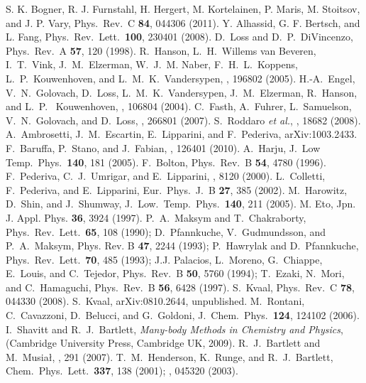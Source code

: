 \documentclass[twocolumn]{revtex4}
\begin{document}
\begin{thebibliography}{200}

 S. K. Bogner, R. J. Furnstahl, H. Hergert, M. Kortelainen, P. Maris, M. Stoitsov, and J. P. Vary, Phys.~Rev.~C {\bf 84}, 044306 (2011).
 Y. Alhassid, G. F. Bertsch, and L. Fang, Phys.~Rev.~Lett.~{\bf 100}, 230401 (2008).
 D.~Loss and D.~P.~DiVincenzo, Phys.~Rev.~A {\bf 57}, 120 (1998).
 R.~Hanson, L.~H.~Willems van Beveren, I.~T.~Vink, J.~M.~Elzerman, W.~J.~M. Naber, F.~H.~L.~Koppens, L.~P.~Kouwenhoven, and L.~M.~K.~Vandersypen, , 196802 (2005).
 H.-A.~Engel, V.~N.~Golovach, D.~Loss, L.~M.~K.~Vandersypen, J.~M.~Elzerman, R.~Hanson, and L.~P.~ Kouwenhoven, , 106804 (2004). 
 C.~Fasth, A.~Fuhrer, L.~Samuelson, V.~N.~Golovach, and D.~Loss, , 266801 (2007).
 S.~Roddaro {\em et al.}, , 18682 (2008).
A.~Ambrosetti, J.~M.~Escartin, E.~Lipparini, and F.~Pederiva, arXiv:1003.2433.
 F.~Baruffa, P.~Stano, and J.~Fabian, , 126401 (2010).
 A.~Harju, J.~Low Temp.~Phys.~{\bf 140}, 181 (2005).
 F.~Bolton, Phys.~Rev.~B {\bf 54}, 4780 (1996).
F.~Pederiva, C.~J.~Umrigar, and E.~Lipparini, , 8120 (2000).
L.~Colletti, F.~Pederiva, and  E.~Lipparini,  Eur.~Phys.~J.~B {\bf 27}, 
385 (2002).
 M.~Harowitz, D.~Shin, and J.~Shumway, J.~Low.~Temp.~Phys.~{\bf 140}, 211 (2005).
 M. Eto, Jpn. J. Appl. Phys. {\bf 36}, 3924 (1997).
 P.~A.~Maksym and T.~Chakraborty, Phys.~Rev.~Lett.~{\bf 65}, 108 (1990);
D.~Pfannkuche, V.~Gudmundsson, and P.~A.~Maksym, Phys. Rev. B {\bf 47}, 2244 (1993);
P.~Hawrylak and D.~Pfannkuche, Phys.~Rev.~Lett.~{\bf 70}, 485 (1993); J.J. Palacios,
L.~Moreno, G.~Chiappe, E.~Louis, and C.~Tejedor, Phys.~Rev.~B {\bf 50}, 5760 (1994);
T.~Ezaki, N.~Mori, and C.~Hamaguchi, Phys.~Rev.~B {\bf 56}, 6428 (1997).
 S.~Kvaal, Phys.~Rev.~C {\bf 78}, 044330 (2008).
 S.~Kvaal, arXiv:0810.2644, unpublished.
 M.~Rontani, C.~Cavazzoni, 
D.~Belucci, and G.~Goldoni, J.~Chem.~Phys.~{\bf 124}, 124102 (2006).
 I.~Shavitt and R.\ J.\ Bartlett, {\em Many-body Methods in Chemistry and Physics},  
(Cambridge University Press, Cambridge UK, 2009). 
 R.\ J.\ Bartlett and M.\ Musia{\l}, , 291 (2007).
 T.~M.~Henderson, K.~Runge, and R.~J.~Bartlett, Chem.~Phys.~Lett.~{\bf 337}, 138 (2001); , 045320 (2003).

\end{thebibliography}
\end{document}
